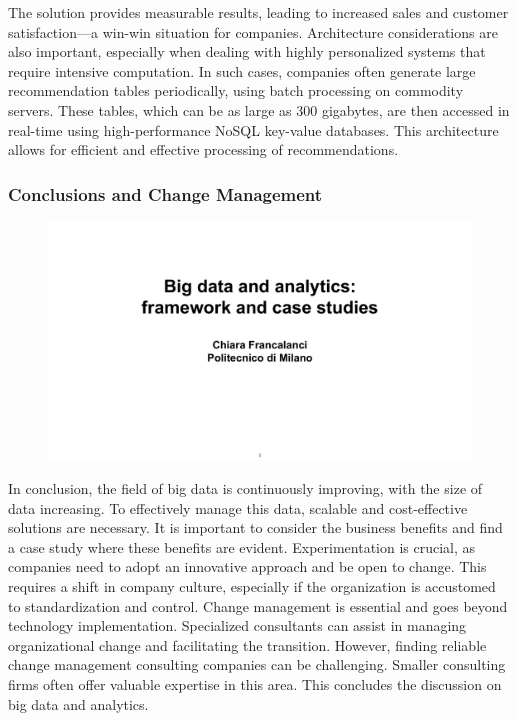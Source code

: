The solution provides measurable results, leading to increased sales and
customer satisfaction---a win-win situation for companies. Architecture
considerations are also important, especially when dealing with highly
personalized systems that require intensive computation. In such cases,
companies often generate large recommendation tables periodically, using
batch processing on commodity servers. These tables, which can be as
large as 300 gigabytes, are then accessed in real-time using
high-performance NoSQL key-value databases. This architecture allows for
efficient and effective processing of recommendations.

\subsubsection{Conclusions and Change Management}

\begin{figure}[!h]
    \centering
    \includegraphics[page=99, trim = 0cm 7cm 1.5cm 4.5cm, clip, width=\textwidth]{images/06 - BIG_DATA.pdf}
\end{figure}

In conclusion, the field of big data is continuously improving, with the
size of data increasing. To effectively manage this data, scalable and
cost-effective solutions are necessary. It is important to consider the
business benefits and find a case study where these benefits are
evident. Experimentation is crucial, as companies need to adopt an
innovative approach and be open to change. This requires a shift in
company culture, especially if the organization is accustomed to
standardization and control. Change management is essential and goes
beyond technology implementation. Specialized consultants can assist in
managing organizational change and facilitating the transition. However,
finding reliable change management consulting companies can be
challenging. Smaller consulting firms often offer valuable expertise in
this area. This concludes the discussion on big data and analytics.

